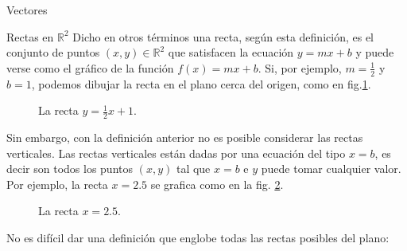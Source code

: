 \documentclass[a4paper,12pt,twoside,spanish]{amsbook}
\theoremstyle{definition}
\theoremstyle{remark}
\newcommand{\R}{\mathbb R}
\begin{document}
\begin{chapter}{Vectores}
\begin{section}{Rectas en $\R^2$}
	Dicho en otros términos una recta,  según esta definición, es el conjunto de puntos $(x,y) \in \R^2$ que satisfacen la ecuación $y = m x + b$ y puede verse como el gráfico de la función $f(x) = m x + b$. Si, por ejemplo, $m=\frac12$ y $b=1$, podemos dibujar la recta en el plano cerca del origen, como en fig.\ref{fig-recta-funcion}.
	\begin{figure}[h]
		\caption{La recta $y = \frac12x +1$.}
		\label{fig-recta-funcion}
	\end{figure} 
	
	Sin embargo, con la definición anterior no es posible considerar las rectas verticales. Las rectas verticales están dadas por una ecuación del tipo $x= b$,  es decir son todos los puntos $(x,y)$  tal que $x=b$ e $y$ puede tomar cualquier valor. Por ejemplo, la recta $x=2.5$ se  grafica  como en la fig. \ref{fig-recta-vertical}.
	\begin{figure}[h]
		\caption{La recta $x=2.5$.}
		\label{fig-recta-vertical}
	\end{figure} 
	
	No es difícil dar una definición que englobe todas las rectas posibles del plano:
	

\end{section}
\end{chapter}
\end{document}
